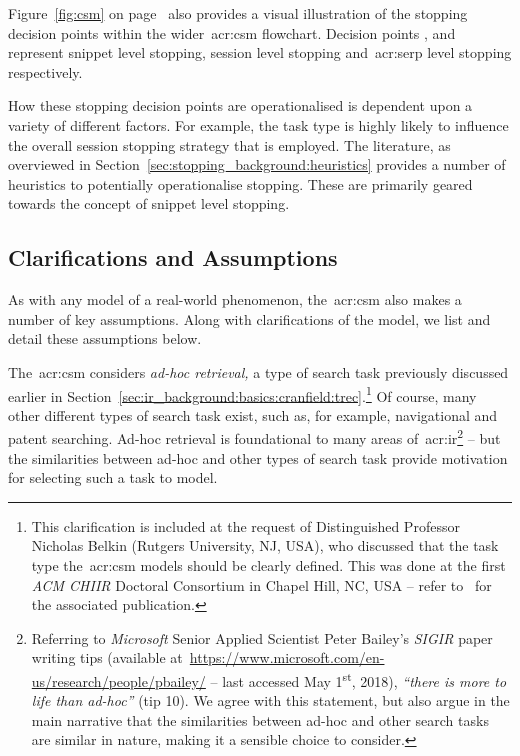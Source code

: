 Figure~\ref{fig:csm} on page~\pageref{fig:csm} also provides a visual illustration of the stopping decision points within the wider~\gls{acr:csm} flowchart. Decision points ,  and  represent snippet level stopping, session level stopping and~\gls{acr:serp} level stopping respectively.

How these stopping decision points are operationalised is dependent upon a variety of different factors. For example, the task type is highly likely to influence the overall session stopping strategy that is employed. The literature, as overviewed in Section~\ref{sec:stopping_background:heuristics} provides a number of heuristics to potentially operationalise stopping. These are primarily geared towards the concept of snippet level stopping.

\subsection{Clarifications and Assumptions}\label{sec:csm:csm:assumptions}
As with any model of a real-world phenomenon, the~\gls{acr:csm} also makes a number of key assumptions. Along with clarifications of the model, we list and detail these assumptions below.

\noindent
{} The~\gls{acr:csm} considers \emph{ad-hoc retrieval,} a type of search task previously discussed earlier in Section~\ref{sec:ir_background:basics:cranfield:trec}.\footnote{This clarification is included at the request of Distinguished Professor Nicholas Belkin (Rutgers University, NJ, USA), who discussed that the task type the~\gls{acr:csm} models should be clearly defined. This was done at the first \emph{ACM CHIIR} Doctoral Consortium in Chapel Hill, NC, USA -- refer to~\cite{maxwell2016dc} for the associated publication.} Of course, many other different types of search task exist, such as, for example, navigational and patent searching. Ad-hoc retrieval is foundational to many areas of~\gls{acr:ir}\footnote{Referring to \emph{Microsoft} Senior Applied Scientist Peter Bailey's \emph{SIGIR} paper writing tips (available at~\url{https://www.microsoft.com/en-us/research/people/pbailey/} -- last accessed May 1\textsuperscript{st}, 2018), \emph{``there is more to life than ad-hoc''} (tip 10). We agree with this statement, but also argue in the main narrative that the similarities between ad-hoc and other search tasks are similar in nature, making it a sensible choice to consider.} -- but the similarities between ad-hoc and other types of search task provide motivation for selecting such a task to model.

